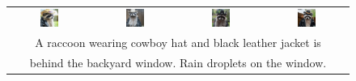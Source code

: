 \begin{figure}[ht!]
\begin{tabular}{cccc}
        \includegraphics[width=0.24\textwidth]{figures/cross/rain_0.jpg} &
        \includegraphics[width=0.24\textwidth]{figures/cross/rain_1.jpg} &
        \includegraphics[width=0.24\textwidth]{figures/cross/rain_2.jpg} &
        \includegraphics[width=0.24\textwidth]{figures/cross/rain_3.jpg} \vspace{-1mm}\\
        \multicolumn{4}{c}{\small A raccoon wearing cowboy hat and black leather jacket is } \\
        \multicolumn{4}{c}{\small behind the backyard window. Rain droplets on the window.}\\
        

\end{tabular}
\end{figure}
